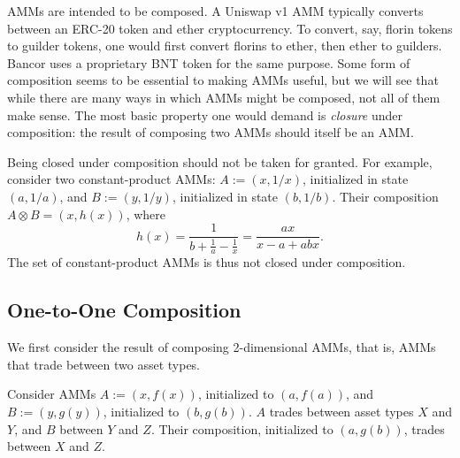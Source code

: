 AMMs are intended to be composed.
A Uniswap v1 AMM typically converts between an ERC-20 token and ether cryptocurrency.
To convert, say, florin tokens to guilder tokens,
one would first convert florins to ether, then ether to guilders.
Bancor uses a proprietary BNT token for the same purpose.
Some form of composition seems to be essential to making AMMs useful,
but we will see that while there are many ways in which AMMs might be composed,
not all of them make sense.
The most basic property one would demand is \emph{closure} under composition:
the result of composing two AMMs should itself be an AMM.

Being closed under composition should not be taken for granted.
For example, consider two constant-product AMMs:
$A := (x, 1 / x)$, initialized in state $(a,1/a)$,
and
$B := (y, 1 / y)$, initialized in state $(b,1/b)$.
Their composition $A \otimes B = (x,h(x))$, where
\begin{equation}
  h(x) = \frac{1}{b + \frac{1}{a} - \frac{1}{x}}
       = \frac{a x}{x - a + a b x}.
\end{equation}
The set of constant-product AMMs is thus not closed under composition.

\subsection{One-to-One Composition}
We first consider the result of composing 2-dimensional AMMs,
that is, AMMs that trade between two asset types.

Consider AMMs $A := (x,f(x))$, initialized to $(a,f(a))$,
and $B := (y,g(y))$, initialized to $(b,g(b))$.
$A$ trades between asset types $X$ and $Y$,
and $B$ between $Y$ and $Z$.
Their composition, initialized to $(a,g(b))$,
trades between $X$ and $Z$.

